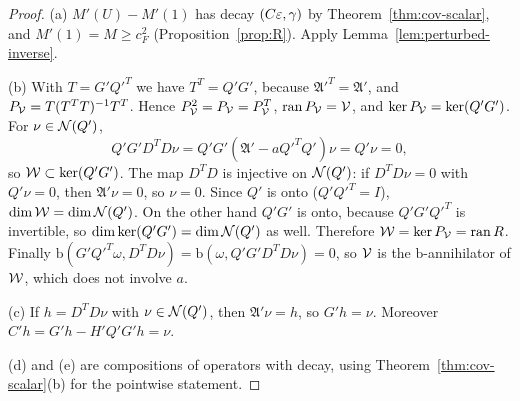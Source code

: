 \begin{proof}
(a) $M'(U)-M'(1)$ has decay $(C\varepsilon,\gamma)$ by Theorem~\ref{thm:cov-scalar}, and $M'(1)=M\ge c_F^2$ (Proposition~\ref{prop:R}). Apply Lemma~\ref{lem:perturbed-inverse}.

(b) With $T=G'Q'^T$ we have $T^T=Q'G'$, because $\mathfrak A'^T=\mathfrak A'$, and $P_\mathcal V=T(T^TT)^{-1}T^T$. Hence $P_\mathcal V^2=P_\mathcal V=P_\mathcal V^T$, $\operatorname{ran} P_\mathcal V=\mathcal V$, and $\ker P_\mathcal V=\ker(Q'G')$. For $\nu\in\mathcal N(Q')$,
\[
Q'G'D^TD\nu=Q'G'(\mathfrak A'-aQ'^TQ')\nu=Q'\nu=0,
\]
so $\mathcal W\subset\ker(Q'G')$. The map $D^TD$ is injective on $\mathcal N(Q')$: if $D^TD\nu=0$ with $Q'\nu=0$, then $\mathfrak A'\nu=0$, so $\nu=0$. Since $Q'$ is onto ($Q'Q'^T=I$), $\dim\mathcal W=\dim\mathcal N(Q')$. On the other hand $Q'G'$ is onto, because $Q'G'Q'^T$ is invertible, so $\dim\ker(Q'G')=\dim\mathcal N(Q')$ as well. Therefore $\mathcal W=\ker P_\mathcal V=\operatorname{ran} R$. Finally $\mathrm b(G'Q'^T\omega,D^TD\nu)=\mathrm b(\omega,Q'G'D^TD\nu)=0$, so $\mathcal V$ is the $\mathrm b$-annihilator of $\mathcal W$, which does not involve $a$.

(c) If $h=D^TD\nu$ with $\nu\in\mathcal N(Q')$, then $\mathfrak A'\nu=h$, so $G'h=\nu$. Moreover $C'h=G'h-H'Q'G'h=\nu$.

(d) and (e) are compositions of operators with decay, using Theorem~\ref{thm:cov-scalar}(b) for the pointwise statement.
\end{proof}
